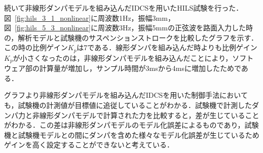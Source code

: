 \documentclass[a4paper,12pt]{article_vdlab_sotsuron}
\begin{document}
\newpage
続いて非線形ダンパモデルを組み込んだIDCSを用いたHILS試験を行った．図~\ref{fig:hils_3_1_nonlinear}に周波数1Hz，振幅3mm，図~\ref{fig:hils_5_3_nonlinear}に周波数3Hz，振幅5mmの正弦波を路面入力した時の，解析モデルと試験機のサスペンションストロークを比較したグラフを示す．この時の比例ゲイン$K_p$は7である．線形ダンパを組み込んだ時よりも比例ゲイン$K_p$が小さくなったのは，非線形ダンパモデルを組み込んだことにより，ソフトウェア部の計算量が増加し，サンプル時間が3msから4msに増加したためである．

グラフより非線形ダンパモデルを組み込んだIDCSを用いた制御手法においても，試験機の計測値が目標値に追従していることがわかる．試験機で計測したダンパ力と非線形ダンパモデルで計算された力を比較すると，差が生じていることがわかる．この差は非線形ダンパモデルのモデル化誤差によるものであり，試験機と試験機モデルとの間にダンパを含めた様々なモデル化誤差が生じているためゲインを高く設定することができないと考えている．
\end{document}
